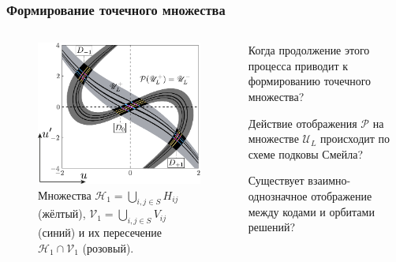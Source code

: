 \documentclass [10pt] {beamer}
\begin{document}
\begin{frame}
	\frametitle{Формирование точечного множества}
	
	\begin{columns}
		\begin{column}{.5\textwidth}
			\begin{figure}
			\includegraphics[width = 1\textwidth]{pic/h- and v-strips for piecewise equation.pdf}
			\caption{
				Множества $\mathscr{H}_1 = \bigcup_{i,j \in S} H_{ij}$ (жёлтый), $\mathscr{V}_1 = \bigcup_{i,j \in S} V_{ij}$ (синий) и их пересечение $\mathscr{H}_1 \cap \mathscr{V}_1$ (розовый).
			}
			\end{figure}
		\end{column}
		\begin{column}{.5\textwidth}
		\begin{center}
			Когда продолжение этого процесса приводит к формированию точечного множества?
			
			\vspace{15pt}
			
			Действие отображения $\mathcal{P}$ на множестве $\mathscr{U}_L$ происходит по схеме подковы Смейла?
			
			\vspace{15pt}
			
			Существует взаимно-однозначное отображение между кодами и орбитами решений?
		\end{center}
		\end{column}
	\end{columns}
\end{frame}
\end{document}
